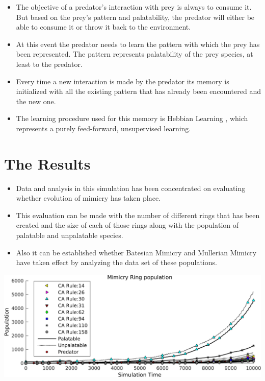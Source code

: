 \documentclass[a0,portrait]{a0poster}
\begin{document}
\begin{multicols}{2}
\begin{itemize}
	\item The objective of a predator's interaction with prey is always to consume it. But based on the prey's pattern and palatability, the predator will either be able to consume it or throw it back to the environment. 
	\item At this event the predator needs to learn the pattern with which the prey has been represented. The pattern represents palatability of the prey species, at least to the predator. 
	\item Every time a new interaction is made by the predator its memory is initialized with all the existing pattern that has already been encountered and the new one.
	\item The learning procedure used for this memory is Hebbian Learning \citep{hebb1949}, which represents a purely feed-forward, unsupervised learning. 
\end{itemize}

\color{DarkSlateGray}
\section*{The Results}

\begin{itemize}
	\item Data and analysis in this simulation has been concentrated on evaluating whether evolution of mimicry has taken place.
	\item This evaluation can be made with the number of different rings that has been created and the size of each of those rings along with the population of palatable and unpalatable species.
	\item Also it can be established whether Batesian Mimicry and Mullerian Mimicry have taken effect by analyzing the data set of these populations.
\end{itemize}

\begin{center}\vspace{1cm}
\includegraphics[width=0.8\linewidth]{simTime10k-2Prey.png}
\label{fig:2prey-species}
\end{center}\vspace{1cm}


\end{multicols}
\end{document}

